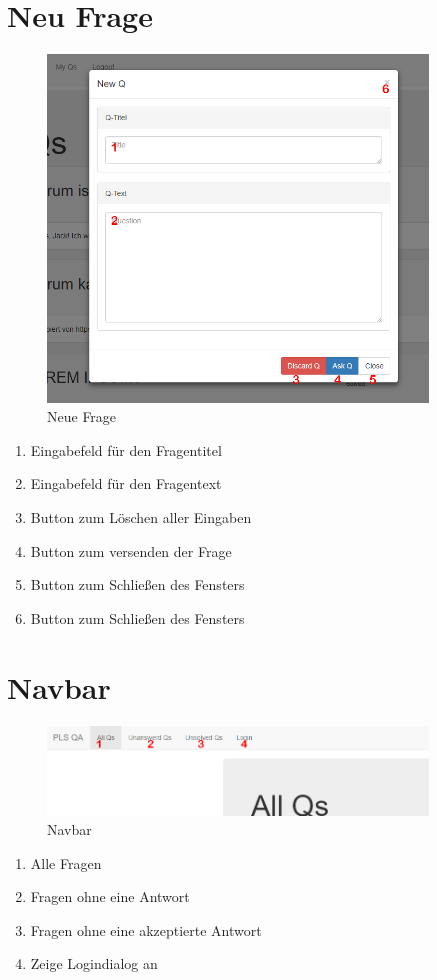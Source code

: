 \documentclass[a4paper]{report}
\begin{document}
\section{Neu Frage}
\begin{figure}[h!]
	\centering
	\includegraphics[width=0.9\textwidth]{./Bilder/NewQ.PNG}
	\caption{Neue Frage}
	\label{fig:NeueFrage}
\end{figure}
\centering\begin{enumerate}
	\item Eingabefeld für den Fragentitel
	\item Eingabefeld für den Fragentext
	\item Button zum Löschen aller Eingaben
	\item Button zum versenden der Frage
	\item Button zum Schließen des Fensters
	\item Button zum Schließen des Fensters
\end{enumerate}
\newpage

\section{Navbar}
\begin{figure}[h!]
	\centering
	\includegraphics[width=0.9\textwidth]{./Bilder/navbar.PNG}
	\caption{Navbar}
	\label{fig:navbar1}
\end{figure}
\centering\begin{enumerate}
	\item Alle Fragen
	\item Fragen ohne eine Antwort
	\item Fragen ohne eine akzeptierte Antwort
	\item Zeige Logindialog an
\end{enumerate}
\end{document}
